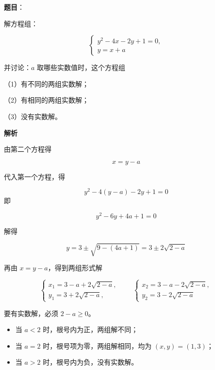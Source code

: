 \begin{answer}

\textbf{题目}：

解方程组：

\nopagebreak[4]
\[
\begin{cases}
y^2-4x-2y+1=0,\\
y=x+a
\end{cases}
\]

并讨论：$a$ 取哪些实数值时，这个方程组

（1）有不同的两组实数解；

（2）有相同的两组实数解；

（3）没有实数解。

\textbf{解析}

由第二个方程得

\nopagebreak[4]
\[
x=y-a
\]

代入第一个方程，得

\nopagebreak[4]
\[
y^2-4(y-a)-2y+1=0
\]
即

\nopagebreak[4]
\[
y^2-6y+4a+1=0
\]

解得

\nopagebreak[4]
\[
y=3\pm\sqrt{9-(4a+1)}
=3\pm2\sqrt{2-a}
\]

再由 $x=y-a$，得到两组形式解

\nopagebreak[4]
\[
\begin{cases}
x_1=3-a+2\sqrt{2-a},\\
y_1=3+2\sqrt{2-a},
\end{cases}
\qquad
\begin{cases}
x_2=3-a-2\sqrt{2-a},\\
y_2=3-2\sqrt{2-a}
\end{cases}
\]

要有实数解，必须 $2-a\ge0$。

\begin{itemize}
\item 当 $a<2$ 时，根号内为正，两组解不同；
\item 当 $a=2$ 时，根号项为零，两组解相同，均为 $(x,y)=(1,3)$；
\item 当 $a>2$ 时，根号内为负，没有实数解。
\end{itemize}


\end{answer}
